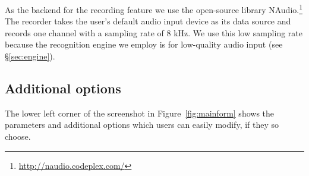 \documentclass[11pt]{article}
\begin{document}
As the backend for the recording feature we use the open-source library NAudio.\footnote{\url{http://naudio.codeplex.com/}}
The recorder takes the user's default audio input device as its data source and records one channel with a sampling rate of 8 kHz. 
We use this low sampling rate because the recognition engine we employ is for low-quality audio input (see \S\ref{sec:engine}).





\subsection{Additional options}
\label{sec:options}

The lower left corner of the screenshot in Figure~\ref{fig:mainform} shows the parameters and additional options which users can easily modify, if they so choose. 
\end{document}
